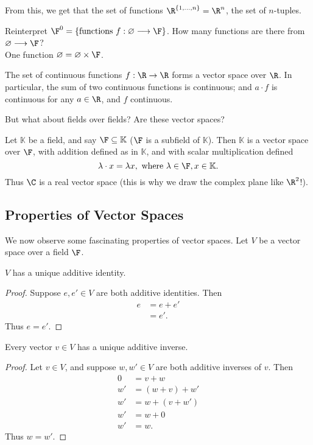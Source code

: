 \documentclass[math0540-lecture-notes.tex]{subfiles}
\begin{document}
From this, we get that the set of functions $\R^{\{ 1,\ldots,n \}}=\R^{n}$, the set of $n$-tuples.
\begin{remark}
  Reinterpret $\F^{0}=\{\text{functions}~ f:\varnothing\longrightarrow \F \}$. How many functions
  are there from $\varnothing\longrightarrow \F$?\\
  One function $\varnothing=\varnothing\times \F$.
\end{remark}

\begin{example}
  The set of continuous functions $f: \R \to \R$ forms a vector space over $\R$. In particular, the
  sum of two continuous functions is continuous; and $a\cdot f$ is continuous for any $a\in \R$, and
  $f$ continuous.
\end{example}

But what about fields over fields? Are these vector spaces?
\begin{example}
  Let $\mathbb{K}$ be a field, and say $\F\subseteq \mathbb{K}$ ($\F$ is a subfield of
  $\mathbb{K}$). Then $\mathbb{K}$ is a vector space over $\F$, with addition defined as in
  $\mathbb{K}$, and with scalar multiplication defined
   \[
     \lambda\cdot x=\lambda x, ~\text{where}~ \lambda\in \F, x\in \mathbb{K}
   .\] Thus $\C$ is a real vector space (this is why we draw the complex plane like $\R^2$!).
\end{example}

\subsection{Properties of Vector Spaces}
We now observe some fascinating properties of vector spaces. Let $V$ be a vector space over a field
$\F$.
\begin{proposition}{}
  $V$ has a unique additive identity.
\end{proposition}
\begin{proof}[Proof]
  Suppose $e,e'\in V$ are both additive identities. Then
   \begin{align*}
      e &= e + e' \\
      &= e'
  .\end{align*} Thus $e=e'$.
\end{proof}

\begin{proposition}{}
  Every vector $v\in V$ has a unique additive inverse.
\end{proposition}
\begin{proof}[Proof]
  Let $v\in V$, and suppose $w,w'\in V$ are both additive inverses of $v$. Then
  \begin{align*}
    0 &= v+w \\
    w' &= (w+v)+w' \\
    w' &= w+(v+w') \\
    w'&= w+0 \\
    w' &= w
  .\end{align*} Thus $w=w'$.
\end{proof}
\end{document}

